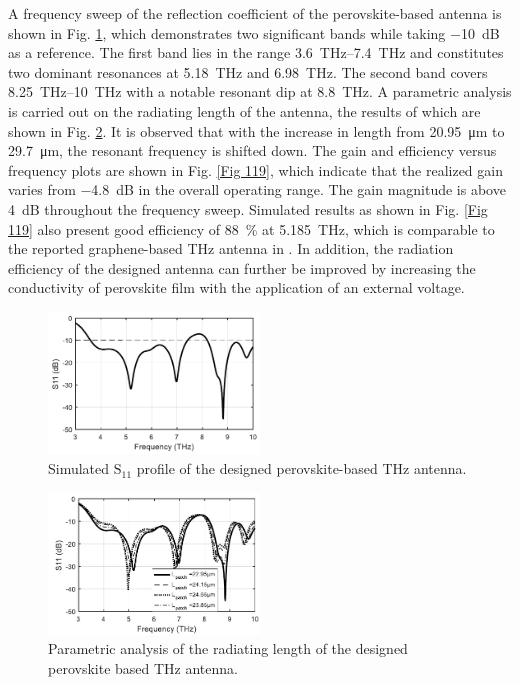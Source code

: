 \documentclass[12pt]{suhbook}
\begin{document}
% 
A frequency sweep of the reflection coefficient of the perovskite-based antenna is shown in Fig. \ref{Fig 17}, which demonstrates two significant bands while taking \SI{-10}{\dB} as a reference. The first band lies in the range \SIrange{3.6}{7.4}{\THz} and constitutes two dominant resonances at \SI{5.18}{\THz} and \SI{6.98}{\THz}. The second band covers \SIrange{8.25}{10}{\THz} with a notable resonant dip at \SI{8.8}{\THz}. A parametric analysis is carried out on the radiating length of the antenna, the results of which are shown in Fig. \ref{Fig 18}. It is observed that with the increase in length from \SI{20.95}{\um} to \SI{29.7}{\um}, the resonant frequency is shifted down. The gain and efficiency versus frequency plots are shown in Fig. \ref{Fig 119}, which indicate that the realized gain varies from \SI{-4.8}{\dB} in the overall operating range. The gain magnitude is above \SI{4}{\dB} throughout the frequency sweep. Simulated results as shown in Fig. \ref{Fig 119} also present good efficiency of \SI{88}{\percent} at \SI{5.185}{\THz}, which is comparable to the reported graphene-based THz antenna in \cite{dashti2018graphene}. In addition, the radiation efficiency of the designed antenna can further be improved by increasing the conductivity of perovskite film with the application of an external voltage.
% 
\begin{figure}[hbt!]
\centering
\includegraphics[width=0.5\textwidth]{17}
\caption{Simulated $\mathrm{S_{11}}$ profile of the designed perovskite-based THz antenna.}
\label{Fig 17}
\end{figure}
\begin{figure}[hbt!]
\centering
\includegraphics[width=0.5\textwidth]{18}
\caption{Parametric analysis of the radiating length of the designed perovskite based THz antenna.}
\label{Fig 18}
\end{figure}
\end{document}
